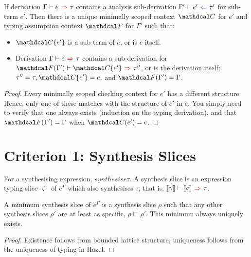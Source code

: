 \begin{proposition}
If derivation $\synthesis{e}{\tau}$ contains a analysis sub-derivation $\analysis[\Gamma']{e'}{\tau'}$ for sub-term $e'$. Then there is a unique minimally scoped context $\C$ for $e'$ and typing assumption context $\F$ for $\Gamma'$ such that:
\begin{itemize}
\item $\C\{e'\}$ is a sub-term of $e$, or is $e$ itself.
\item Derivation $\synthesis{e}{\tau}$ contains a sub-derivation for $\synthesis[\F(\Gamma')]{\C\{e'\}}{\tau''}$, or is the derivation itself: $\tau'' = \tau, \C\{e'\} = e,$ and $\F(\Gamma') = \Gamma$.
\end{itemize}
\end{proposition}
\begin{proof}
Every minimally scoped checking context for $e'$ has a different structure. Hence, only one of these matches with the structure of $e'$ in $e$. You simply need to verify that one always exists (induction on the typing derivation), and that $\F(\Gamma') = \Gamma$ when $\C(e') = e$.
\end{proof}

\section{Criterion 1: Synthesis Slices}
\begin{definition}
For a synthesising expression, $synthesis{e}{\tau}$. A synthesis slice is an expression typing slice $\varsigma^{\gamma}$ of $e^\Gamma$ which also synthesises $\tau$, that is, $\synthesis[\type{\gamma}]{\type{\varsigma}}{\tau}$.
\end{definition}
\begin{proposition}
A minimum synthesis slice of $e^\Gamma$ is a synthesis slice $\rho$ such that any other synthesis slices $\rho'$ are at least as specific, $\rho \sqsubseteq \rho'$. This minimum always uniquely exists.
\end{proposition}
\begin{proof}
Existence follows from bounded lattice structure, uniqueness follows from the uniqueness of typing in Hazel.
\end{proof}

